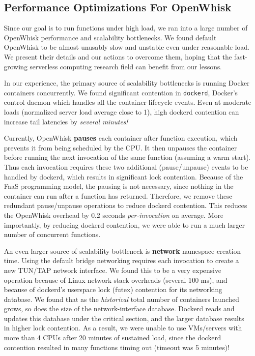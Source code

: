 \vspace*{-0.2cm}
\subsection{Performance Optimizations For OpenWhisk}

Since our goal is to run functions under high load, we ran into a large number of OpenWhisk performance and scalability bottlenecks.
We found default OpenWhisk to be almost unusably slow and unstable even under reasonable load. 
We present their details and our actions to overcome them, hoping that the fast-growing serverless computing research field can benefit from our lessons. 


In our experience, the primary source of scalability bottlenecks is running Docker containers concurrently.
We found significant contention in \texttt{dockerd}, Docker's control daemon which handles all the container lifecycle events.
Even at moderate loads (normalized server load average close to 1), high dockerd contention can increase tail latencies by \emph{several minutes!}


Currently, OpenWhisk \textbf{pauses} each container after function execution, which prevents it from being scheduled by the CPU.
It then unpauses the container before running the next invocation of the same function (assuming a warm start).
Thus each invocation requires these two additional (pause/unpause) events to be handled by dockerd, which results in significant lock contention.
Because of the FaaS programming model, the pausing is not necessary, since nothing in the container can run after a function has returned.
Therefore, we remove these redundant pause/unpause operations to reduce dockerd contention.
This reduces the OpenWhisk overhead by 0.2 seconds \emph{per-invocation} on average.
More importantly, by reducing dockerd contention, we were able to run a much larger number of concurrent functions. 

An even larger source of scalability bottleneck is \textbf{network} namespace creation time.
Using the default bridge networking requires each invocation to create a new TUN/TAP network interface.
We found this to be a very expensive operation because of Linux network stack overheads (several 100 ms), and because of dockerd's userspace lock (futex) contention for its networking database. 
We found that as the \emph{historical} total number of containers launched grows, so does the size of the network-interface database.
Dockerd reads and updates this database under the critical section, and the larger database results in higher lock contention.
As a result, we were unable to use VMs/servers with more than 4 CPUs after 20 minutes of sustained load, since the dockerd contention resulted in many functions timing out (timeout was 5 minutes)! 

